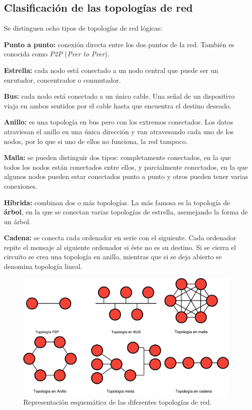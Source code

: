 \documentclass[a4paper, 11pt]{report} %
\begin{document}
\subsection{Clasificación de las topologías de red}
Se distinguen ocho tipos de topologías de red lógicas: \cite{bicsi-02}
\renewcommand{\labelitemi}{$\bullet$}
\begin{description}
\item \textbf{Punto a punto:} conexión directa entre los dos puntos de la red. También es conocida como \textit{P2P} (\textit{Peer to Peer}).
\item \textbf{Estrella:} cada nodo está conectado a un nodo central que puede ser un enrutador, concentrador o conmutador.
\item \textbf{Bus:} cada nodo está conectado a un único cable. Una señal de un dispositivo viaja en ambos sentidos por el cable hasta que encuentra el destino deseado.
\item \textbf{Anillo:} es una topología en bus pero con los extremos conectados. Los datos atraviesan el anillo en una única dirección y van atravesando cada uno de los nodos, por lo que si uno de ellos no funciona, la red tampoco.
\item \textbf{Malla:} se pueden distinguir dos tipos: completamente conectados, en la que todos los nodos están conectados entre ellos, y parcialmente conectados, en la que algunos nodos pueden estar conectados punto a punto y otros pueden tener varias conexiones.
\item \textbf{Híbrida:} combinan dos o más topologías. La más famosa es la topología de \textbf{árbol}, en la que se conectan varias topologías de estrella, asemejando la forma de un árbol.
\item \textbf{Cadena:} se conecta cada ordenador en serie con el siguiente. Cada ordenador repite el mensaje al siguiente ordenador si éste no es su destino. Si se cierra el circuito se crea una topología en anillo, mientras que si se deja abierto se denomina topología lineal.
\end{description}

\begin{figure}[H]
\centering
\includegraphics[width=\textwidth]{Resources/Top/Topdered.pdf}
\caption{Representación esquemática de las diferentes topologías de red.}
\end{figure}
\end{document}

